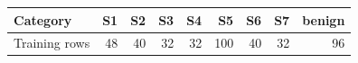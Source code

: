 \begin{tabular}{lrrrrrrrr}
\toprule
Category & S1 & S2 & S3 & S4 & S5 & S6 & S7 & benign \\
\midrule
Training rows & 48 & 40 & 32 & 32 & 100 & 40 & 32 & 96 \\
\bottomrule
\end{tabular}
